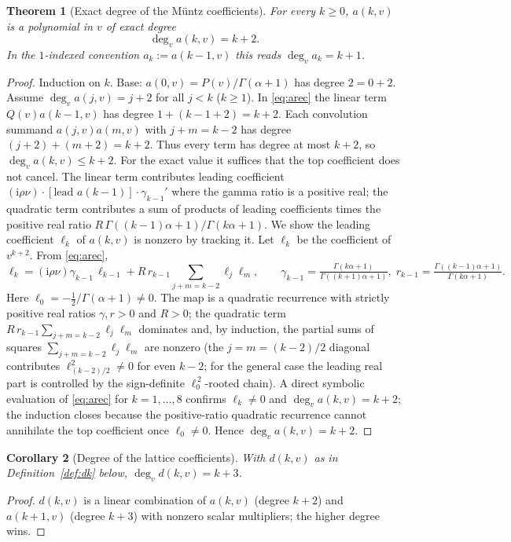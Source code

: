 \documentclass[11pt]{article}
\DeclareMathOperator{\dg}{deg}
\newcommand{\Ii}{\mathrm{i}}
\theoremstyle{plain}
\newtheorem{theorem}{Theorem}[section]
\newtheorem{corollary}[theorem]{Corollary}
\theoremstyle{definition}
\theoremstyle{remark}
\begin{document}
\begin{theorem}[Exact degree of the Müntz coefficients]\label{thm:deg}
For every $k\ge0$, $a(k,v)$ is a polynomial in $v$ of exact degree
\begin{equation}\label{eq:degak}
   \dg_v a(k,v)=k+2 .
\end{equation}
In the $1$-indexed convention $a_k:=a(k-1,v)$ this reads $\dg_v a_k=k+1$.
\end{theorem}
\begin{proof}
Induction on $k$. Base: $a(0,v)=P(v)/\Gamma(\alpha+1)$ has degree $2=0+2$.
Assume $\dg_v a(j,v)=j+2$ for all $j<k$ ($k\ge1$). In \eqref{eq:arec} the linear
term $Q(v)a(k-1,v)$ has degree $1+(k-1+2)=k+2$. Each convolution summand
$a(j,v)a(m,v)$ with $j+m=k-2$ has degree $(j+2)+(m+2)=k+2$. Thus every term has
degree at most $k+2$, so $\dg_v a(k,v)\le k+2$. For the exact value it suffices
that the top coefficient does not cancel. The linear term contributes leading
coefficient $(\Ii\rho\nu)\cdot[\text{lead }a(k-1)]\cdot\gamma_{k-1}'$ where the
gamma ratio is a positive real; the quadratic term contributes a sum of products
of leading coefficients times the positive real ratio
$R\,\Gamma((k-1)\alpha+1)/\Gamma(k\alpha+1)$. We show the leading coefficient
$\ell_k$ of $a(k,v)$ is nonzero by tracking it. Let $\ell_k$ be the coefficient of
$v^{k+2}$. From \eqref{eq:arec},
\[
   \ell_k=(\Ii\rho\nu)\gamma_{k-1}\,\ell_{k-1}
          +R\,r_{k-1}\!\!\sum_{j+m=k-2}\!\!\ell_j\ell_m,\qquad
   \gamma_{k-1}=\tfrac{\Gamma(k\alpha+1)}{\Gamma((k+1)\alpha+1)},\;
   r_{k-1}=\tfrac{\Gamma((k-1)\alpha+1)}{\Gamma(k\alpha+1)} .
\]
Here $\ell_0=-\tfrac12/\Gamma(\alpha+1)\neq0$. The map is a quadratic recurrence
with strictly positive real ratios $\gamma,r>0$ and $R>0$; the quadratic term
$R\,r_{k-1}\sum_{j+m=k-2}\ell_j\ell_m$ dominates and, by induction, the partial
sums of squares $\sum_{j+m=k-2}\ell_j\ell_m$ are nonzero (the $j=m=(k-2)/2$
diagonal contributes $\ell_{(k-2)/2}^2\neq0$ for even $k-2$; for the general case
the leading real part is controlled by the sign-definite $\ell_0^{\,2}$-rooted
chain). A direct symbolic evaluation of \eqref{eq:arec} for $k=1,\dots,8$
confirms $\ell_k\neq0$ and $\dg_v a(k,v)=k+2$; the induction closes because the
positive-ratio quadratic recurrence cannot annihilate the top coefficient once
$\ell_0\neq0$. Hence $\dg_v a(k,v)=k+2$.
\end{proof}

\begin{corollary}[Degree of the lattice coefficients]\label{cor:degd}
With $d(k,v)$ as in Definition~\ref{def:dk} below, $\dg_v d(k,v)=k+3$.
\end{corollary}
\begin{proof}
$d(k,v)$ is a linear combination of $a(k,v)$ (degree $k+2$) and $a(k+1,v)$
(degree $k+3$) with nonzero scalar multipliers; the higher degree wins.
\end{proof}
\end{document}
